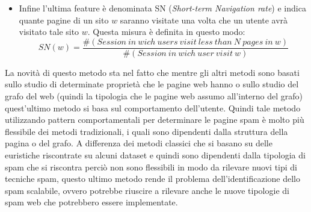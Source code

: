 \begin{itemize}
 \item Infine l'ultima feature è denominata SN (\textit{Short-term Navigation rate}) e indica quante pagine di un sito \(w\) saranno visitate una volta che un utente avrà visitato tale sito \(w\). Questa misura è definita in questo modo:
 \begin{equation}
  SN(w)=\frac{\#(Session\ in\ wich\ users\ visit\ less\ than\ N\ pages\ in\ w)}{\#(Session\ in\ wich\ user\ visit\ w)}
 \end{equation}
 \end{itemize}
La novità di questo metodo sta nel fatto che mentre gli altri metodi sono basati sullo studio di determinate proprietà che le pagine web hanno o sullo studio del grafo del web  (quindi la tipologia che le pagine web assumo all'interno del grafo) quest'ultimo metodo si basa sul comportamento dell'utente. Quindi tale metodo utilizzando pattern comportamentali per determinare le pagine spam è molto più flessibile dei metodi tradizionali, i quali sono dipendenti dalla struttura della pagina o del grafo.
A differenza  dei metodi classici che si basano su delle euristiche riscontrate su alcuni dataset e quindi sono dipendenti dalla tipologia di spam che si riscontra perciò non sono flessibili in modo da rilevare nuovi tipi di tecniche spam, questo ultimo metodo rende il problema dell'identificazione dello spam scalabile, ovvero potrebbe riuscire a rilevare anche le nuove tipologie di spam web che potrebbero essere implementate. 

